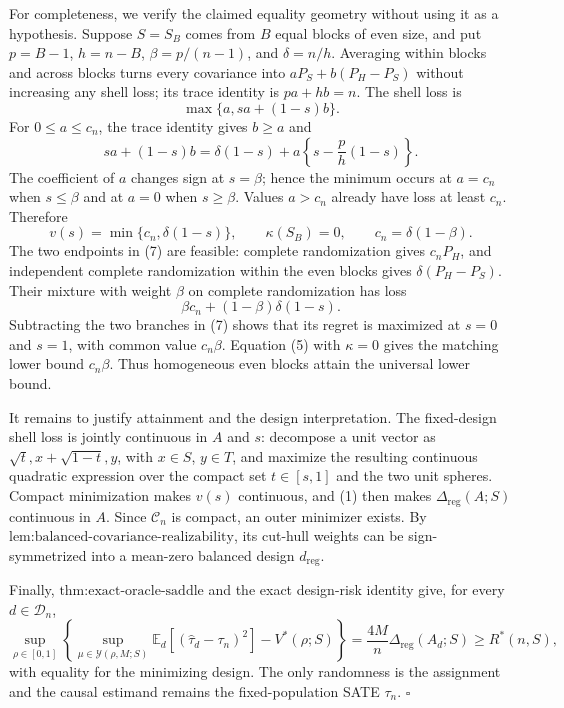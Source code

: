 For completeness, we verify the claimed equality geometry without using it as a hypothesis.  Suppose \(S=S_B\) comes from \(B\) equal blocks of even size, and put \(p=B-1\), \(h=n-B\), \(\beta=p/(n-1)\), and \(\delta=n/h\).  Averaging within blocks and across blocks turns every covariance into \(aP_S+b(P_H-P_S)\) without increasing any shell loss; its trace identity is \(pa+hb=n\).  The shell loss is
\[
\max\{a,sa+(1-s)b\}.
\]
For \(0\leq a\leq c_n\), the trace identity gives \(b\geq a\) and
\[
sa+(1-s)b
=\delta(1-s)+a\left\{s-\frac{p}{h}(1-s)\right\}.
\]
The coefficient of \(a\) changes sign at \(s=\beta\); hence the minimum occurs at \(a=c_n\) when \(s\leq\beta\) and at \(a=0\) when \(s\geq\beta\).  Values \(a>c_n\) already have loss at least \(c_n\).  Therefore
\[
v(s)=\min\{c_n,\delta(1-s)\},
\qquad \kappa(S_B)=0,
\qquad c_n=\delta(1-\beta).
\tag{7}
\]
The two endpoints in (7) are feasible: complete randomization gives \(c_nP_H\), and independent complete randomization within the even blocks gives \(\delta(P_H-P_S)\).  Their mixture with weight \(\beta\) on complete randomization has loss
\[
\beta c_n+(1-\beta)\delta(1-s).
\]
Subtracting the two branches in (7) shows that its regret is maximized at \(s=0\) and \(s=1\), with common value \(c_n\beta\).  Equation (5) with \(\kappa=0\) gives the matching lower bound \(c_n\beta\).  Thus homogeneous even blocks attain the universal lower bound.

It remains to justify attainment and the design interpretation.  The fixed-design shell loss is jointly continuous in \(A\) and \(s\): decompose a unit vector as \(\sqrt t,x+\sqrt{1-t},y\), with \(x\in S\), \(y\in T\), and maximize the resulting continuous quadratic expression over the compact set \(t\in[s,1]\) and the two unit spheres.  Compact minimization makes \(v(s)\) continuous, and (1) then makes \(\Delta_{\mathrm{reg}}(A;S)\) continuous in \(A\).  Since \(\mathcal C_n\) is compact, an outer minimizer exists.  By \(\text{lem:balanced-covariance-realizability}\), its cut-hull weights can be sign-symmetrized into a mean-zero balanced design \(d_{\mathrm{reg}}\).

Finally, \(\text{thm:exact-oracle-saddle}\) and the exact design-risk identity give, for every \(d\in\mathcal D_n\),
\[
\sup_{\rho\in[0,1]}
\left\{
\sup_{\mu\in\mathcal Y(\rho,M;S)}
\mathbb E_d[(\widehat\tau_d-\tau_n)^2]-V^*(\rho;S)
\right\}
=\frac{4M}{n}\Delta_{\mathrm{reg}}(A_d;S)
\geq R^*(n,S),
\]
with equality for the minimizing design.  The only randomness is the assignment and the causal estimand remains the fixed-population SATE \(\tau_n\). \(\square\)